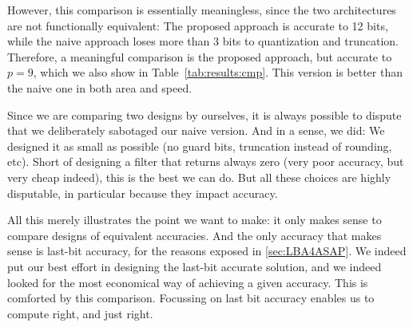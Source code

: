 \documentclass[twocolumn]{IEEEtran}
\begin{document}
However, this comparison is essentially meaningless, since the two architectures are not functionally equivalent: 
The proposed approach is accurate to 12 bits, while the naive approach loses more than 3 bits to quantization and truncation.
Therefore, a meaningful comparison is the proposed approach, but accurate to $p=9$, which we also show in Table~\ref{tab:results:cmp}. 
This version is better than the naive one in both area and speed.

Since we are comparing two designs by ourselves, it is always possible to dispute that we deliberately sabotaged our naive version. 
And in a sense, we did:
We designed it as small as possible (no guard bits, truncation instead of rounding, etc).
Short of designing a filter that returns always zero (very poor accuracy, but very cheap indeed), this is the best we can do. 
But all these choices are highly disputable, in particular because they impact accuracy.
  
All this merely illustrates the point we want to make: 
it only makes sense to compare designs of equivalent accuracies. 
And the only accuracy that makes sense is last-bit accuracy, for the reasons exposed in \ref{sec:LBA4ASAP}.  
We indeed put our best effort in designing the last-bit accurate solution, and we indeed looked for the most economical way of achieving a given accuracy. 
This is comforted by this comparison. 
Focussing on last bit accuracy enables us to compute right, and just right.
\end{document}
